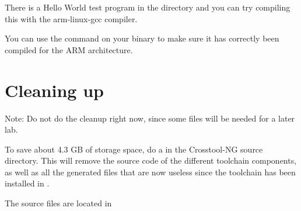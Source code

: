 There is a Hello World test program in the  directory
and you can try compiling this with the arm-linux-gcc compiler.

You can use the  command on your binary to make sure it has
correctly been compiled for the ARM architecture.

\section{Cleaning up}
Note: Do not do the cleanup right now, since some files will be needed 
for a later lab.

To save about 4.3 GB of storage space, do a  in the
Crosstool-NG source directory. This will remove the source code of the
different toolchain components, as well as all the generated files
that are now useless since the toolchain has been installed in
.

The source files are located in 
